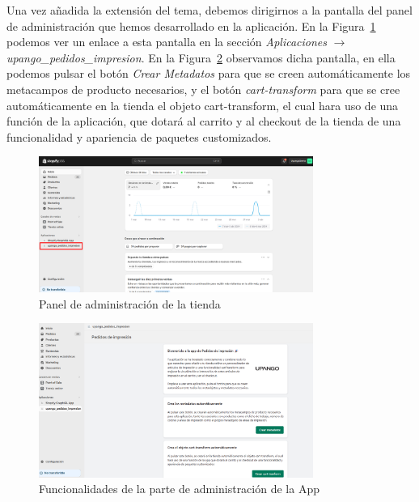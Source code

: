 \documentclass[12pt]{article}
\begin{document}
Una vez añadida la extensión del tema, debemos dirigirnos a la pantalla del panel de administración que hemos desarrollado en la aplicación. En la Figura~\ref{fig:PanelAdministracion} podemos
ver un enlace a esta pantalla en la sección \textit{Aplicaciones} $\rightarrow$  \textit{upango\_pedidos\_impresion}. En la Figura~\ref{fig:FuncionalidadAdministracion} observamos dicha pantalla, en ella podemos pulsar el botón \textit{Crear Metadatos} para que se creen 
automáticamente los metacampos de producto necesarios, y el botón \textit{cart-transform} para que se cree automáticamente en la tienda el objeto cart-transform, el cual hara uso de una función de la aplicación, que 
dotará al carrito y al checkout de la tienda de una funcionalidad y apariencia de paquetes customizados.

\begin{figure}[ht]
    \centering
    \includegraphics[width=0.8\textwidth]{imagenes/ManualUsuario/PaginaAdministracion.png}
    \caption{\label{fig:PanelAdministracion}Panel de administración de la tienda}
    \vspace{\fill}
\end{figure}

\begin{figure}[ht]
    \centering
    \includegraphics[width=0.8\textwidth]{imagenes/ManualUsuario/FuncionalidadPaginaAdministracion.png}
    \caption{\label{fig:FuncionalidadAdministracion}Funcionalidades de la parte de administración de la App}
    \vspace{\fill}
\end{figure}
\end{document}
